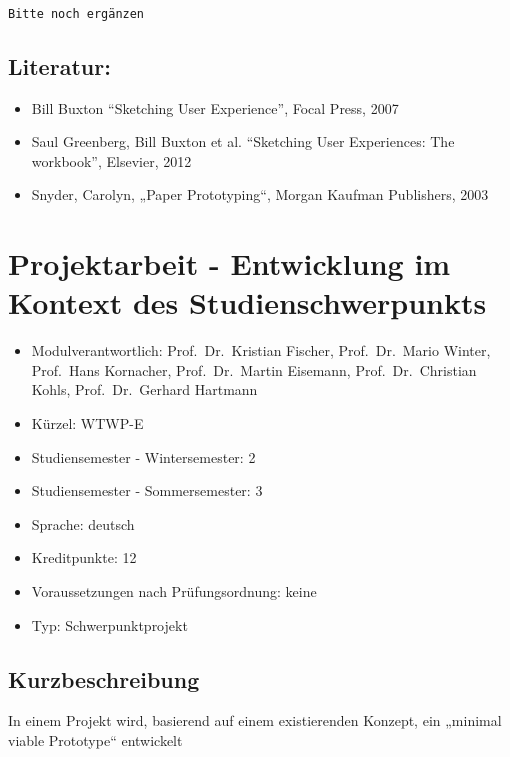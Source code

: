 \begin{verbatim}

Bitte noch ergänzen
\end{verbatim}

\section*{Literatur:}\label{literatur-7}

\begin{itemize}
\item
  Bill Buxton ``Sketching User Experience'', Focal Press, 2007
\item
  Saul Greenberg, Bill Buxton et al. ``Sketching User Experiences: The
  workbook'', Elsevier, 2012
\item
  Snyder, Carolyn, „Paper Prototyping``, Morgan Kaufman Publishers, 2003
\end{itemize}

\chapter{Projektarbeit - Entwicklung im Kontext des
Studienschwerpunkts}\label{projektarbeit---entwicklung-im-kontext-des-studienschwerpunkts}

\begin{itemize}
\tightlist
\item
  Modulverantwortlich: Prof.~Dr.~Kristian Fischer, Prof.~Dr.~Mario
  Winter, Prof.~Hans Kornacher, Prof.~Dr.~Martin Eisemann,
  Prof.~Dr.~Christian Kohls, Prof.~Dr.~Gerhard Hartmann
\item
  Kürzel: WTWP-E
\item
  Studiensemester - Wintersemester: 2
\item
  Studiensemester - Sommersemester: 3
\item
  Sprache: deutsch
\item
  Kreditpunkte: 12
\item
  Voraussetzungen nach Prüfungsordnung: keine
\item
  Typ: Schwerpunktprojekt
\end{itemize}

\section*{Kurzbeschreibung}\label{kurzbeschreibung-2}

In einem Projekt wird, basierend auf einem existierenden Konzept, ein
„minimal viable Prototype`` entwickelt

